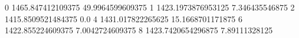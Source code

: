 0 1465.847412109375 49.9964599609375
1 1423.1973876953125 7.346435546875
2 1415.8509521484375 0.0
4 1431.017822265625 15.1668701171875
6 1422.855224609375 7.0042724609375
8 1423.7420654296875 7.89111328125
